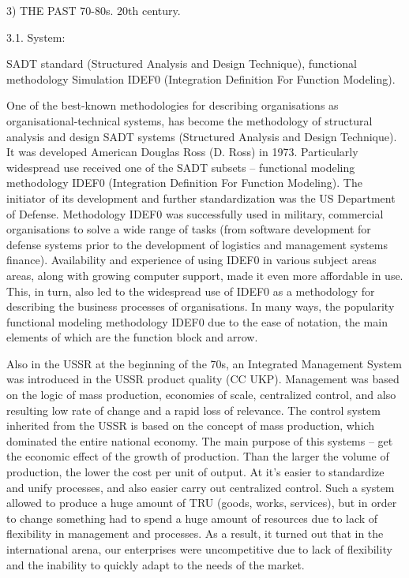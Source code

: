 \documentclass[11pt,a4paper]{book}
\begin{document}
3) THE PAST 70-80s. 20th century.

3.1. System:

SADT standard (Structured Analysis and Design Technique), functional
methodology Simulation IDEF0 (Integration Definition For Function Modeling).

One of the best-known methodologies for describing organisations as
organisational-technical systems, has become the methodology of structural
analysis and design SADT systems (Structured Analysis and Design Technique).
It was developed American Douglas Ross (D. Ross) in 1973. Particularly
widespread use received one of the SADT subsets -- functional modeling
methodology IDEF0 (Integration Definition For Function Modeling). The
initiator of its development and further standardization was the US Department
of Defense. Methodology IDEF0 was successfully used in military, commercial
organisations to solve a wide range of tasks (from software development for
defense systems prior to the development of logistics and management systems
finance). Availability and experience of using IDEF0 in various subject areas
areas, along with growing computer support, made it even more affordable in
use. This, in turn, also led to the widespread use of IDEF0 as a methodology
for describing the business processes of organisations. In many ways, the
popularity functional modeling methodology IDEF0 due to the ease of notation,
the main elements of which are the function block and arrow.

Also in the USSR at the beginning of the 70s, an Integrated Management System
was introduced in the USSR product quality (CC UKP). Management was based on
the logic of mass production, economies of scale, centralized control, and
also resulting low rate of change and a rapid loss of relevance.  The control
system inherited from the USSR is based on the concept of mass production,
which dominated the entire national economy. The main purpose of this systems
-- get the economic effect of the growth of production. Than the larger the
volume of production, the lower the cost per unit of output. At it’s easier to
standardize and unify processes, and also easier carry out centralized
control. Such a system allowed to produce a huge amount of TRU (goods, works,
services), but in order to change something had to spend a huge amount of
resources due to lack of flexibility in management and processes. As a result,
it turned out that in the international arena, our enterprises were
uncompetitive due to lack of flexibility and the inability to quickly adapt to
the needs of the market.
\end{document}
